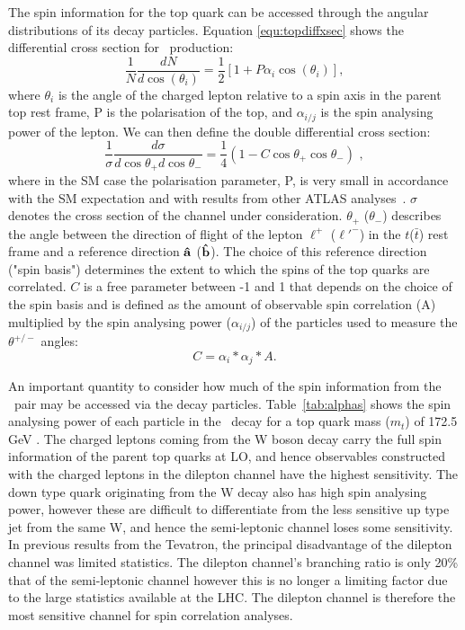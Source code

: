 The spin information for the top quark can be accessed through the angular distributions of its decay particles. Equation \ref{equ:topdiffxsec} shows the differential cross section for \ttbar\ production:
\begin{equation}
\frac{1}{N} \frac{dN}{d \cos (\theta_i)} = \frac{1}{2} \left[1 + P \alpha_i \cos(\theta_i) \right],
\label{equ:topdiffxsec}
\end{equation}
where $\theta_i$ is the angle of the charged lepton relative to a spin axis in the parent top rest frame, P is the polarisation of the top, and $\alpha_{i/j}$ is the spin analysing power of the lepton. We can then define the double differential cross section:
\begin{equation}
\frac{1}{\sigma} \frac{d\sigma}{d\cos\theta_+ d\cos\theta_-} =
\frac{1}{4} ( 1 - C \cos\theta_+ \cos\theta_- ) \,\, ,
\label{eq:coscos}
\end{equation}
where in the SM case the polarisation parameter, P, is very small in accordance with the SM expectation and with results from other ATLAS analyses~\cite{polarisation}. $\sigma$ denotes the cross section of the channel under consideration. $\theta_+$ ($\theta_-$) describes the angle between the direction of flight of the lepton $\ell^+$ ($\ell'^-$) in the $t$($\bar{t}$) rest frame and a reference direction $\bf \hat{a}$ ($\bf\hat{b}$). The choice of this reference direction ("spin basis") determines the extent to which the spins of the top quarks are correlated. $C$ is a free parameter between -1 and 1 that depends on the choice of the spin basis and is defined as the amount of observable spin correlation (A) multiplied by the spin analysing power ($\alpha_{i/j}$) of the particles used to measure the $\theta^{+/-}$ angles:
\begin{equation}
    C = \alpha_{i}*\alpha_{j}*A.
\end{equation}

An important quantity to consider how much of the spin information from the \ttbar\ pair may be accessed via the decay particles. Table~\ref{tab:alphas} shows the spin analysing power of each particle in the \ttbar\ decay for a top quark mass ($m_t$) of 172.5 GeV . The charged leptons coming from the W boson decay carry the full spin information of the parent top quarks at LO, and hence observables constructed with the charged leptons in the dilepton channel have the highest sensitivity. The down type quark originating from the W decay also has high spin analysing power, however these are difficult to differentiate from the less sensitive up type jet from the same W, and hence the semi-leptonic channel loses some sensitivity. In previous results from the Tevatron, the principal disadvantage of the dilepton channel was limited statistics. The dilepton channel's branching ratio is only 20\% that of the semi-leptonic channel however this is no longer a limiting factor due to the large statistics available at the LHC. The dilepton channel is therefore the most sensitive channel for spin correlation analyses. 

